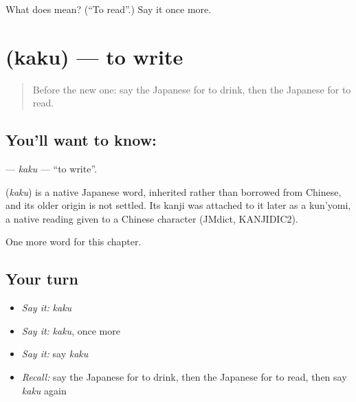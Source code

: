 \begin{tcolorbox}[breakable,colback=teal!4,colframe=teal!35!black,title={Before you move on}]
What does  mean? (\textquotedblleft{}To read\textquotedblright{}.) Say it once more.
\end{tcolorbox}
\section[\texorpdfstring{\ja{かく} (kaku)}{かく (kaku)}]{ (kaku) — to write}

\label{lesson:JA-C27-kaku}



\begin{quote}
Before the new one: say the Japanese for to drink, then the Japanese for to read.
\end{quote}

\subsection*{You'll want to know: }
\textbf{} — \emph{kaku} — \textquotedblleft{}to write\textquotedblright{}.

\begin{cousinweb}
\textbf{} (\emph{kaku}) is a native Japanese word, inherited rather than borrowed from Chinese, and its older origin is not settled. Its kanji was attached to it later as a kun'yomi, a native reading given to a Chinese character (JMdict, KANJIDIC2).
\end{cousinweb}

\begin{grammarlens}[title={What you've built}]
One more word for this chapter.
\end{grammarlens}

\subsection*{Your turn}
\begin{itemize}
\raggedright
  \item \emph{Say it:} \emph{kaku}
  \item \emph{Say it:} \emph{kaku}, once more
  \item \emph{Say it:} say \emph{kaku}
  \item \emph{Recall:} say the Japanese for to drink, then the Japanese for to read, then say \emph{kaku} again
\end{itemize}

